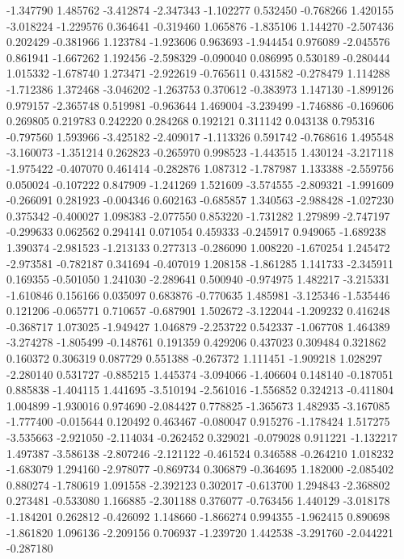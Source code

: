 -1.347790
1.485762
-3.412874
-2.347343
-1.102277
0.532450
-0.768266
1.420155
-3.018224
-1.229576
0.364641
-0.319460
1.065876
-1.835106
1.144270
-2.507436
0.202429
-0.381966
1.123784
-1.923606
0.963693
-1.944454
0.976089
-2.045576
0.861941
-1.667262
1.192456
-2.598329
-0.090040
0.086995
0.530189
-0.280444
1.015332
-1.678740
1.273471
-2.922619
-0.765611
0.431582
-0.278479
1.114288
-1.712386
1.372468
-3.046202
-1.263753
0.370612
-0.383973
1.147130
-1.899126
0.979157
-2.365748
0.519981
-0.963644
1.469004
-3.239499
-1.746886
-0.169606
0.269805
0.219783
0.242220
0.284268
0.192121
0.311142
0.043138
0.795316
-0.797560
1.593966
-3.425182
-2.409017
-1.113326
0.591742
-0.768616
1.495548
-3.160073
-1.351214
0.262823
-0.265970
0.998523
-1.443515
1.430124
-3.217118
-1.975422
-0.407070
0.461414
-0.282876
1.087312
-1.787987
1.133388
-2.559756
0.050024
-0.107222
0.847909
-1.241269
1.521609
-3.574555
-2.809321
-1.991609
-0.266091
0.281923
-0.004346
0.602163
-0.685857
1.340563
-2.988428
-1.027230
0.375342
-0.400027
1.098383
-2.077550
0.853220
-1.731282
1.279899
-2.747197
-0.299633
0.062562
0.294141
0.071054
0.459333
-0.245917
0.949065
-1.689238
1.390374
-2.981523
-1.213133
0.277313
-0.286090
1.008220
-1.670254
1.245472
-2.973581
-0.782187
0.341694
-0.407019
1.208158
-1.861285
1.141733
-2.345911
0.169355
-0.501050
1.241030
-2.289641
0.500940
-0.974975
1.482217
-3.215331
-1.610846
0.156166
0.035097
0.683876
-0.770635
1.485981
-3.125346
-1.535446
0.121206
-0.065771
0.710657
-0.687901
1.502672
-3.122044
-1.209232
0.416248
-0.368717
1.073025
-1.949427
1.046879
-2.253722
0.542337
-1.067708
1.464389
-3.274278
-1.805499
-0.148761
0.191359
0.429206
0.437023
0.309484
0.321862
0.160372
0.306319
0.087729
0.551388
-0.267372
1.111451
-1.909218
1.028297
-2.280140
0.531727
-0.885215
1.445374
-3.094066
-1.406604
0.148140
-0.187051
0.885838
-1.404115
1.441695
-3.510194
-2.561016
-1.556852
0.324213
-0.411804
1.004899
-1.930016
0.974690
-2.084427
0.778825
-1.365673
1.482935
-3.167085
-1.777400
-0.015644
0.120492
0.463467
-0.080047
0.915276
-1.178424
1.517275
-3.535663
-2.921050
-2.114034
-0.262452
0.329021
-0.079028
0.911221
-1.132217
1.497387
-3.586138
-2.807246
-2.121122
-0.461524
0.346588
-0.264210
1.018232
-1.683079
1.294160
-2.978077
-0.869734
0.306879
-0.364695
1.182000
-2.085402
0.880274
-1.780619
1.091558
-2.392123
0.302017
-0.613700
1.294843
-2.368802
0.273481
-0.533080
1.166885
-2.301188
0.376077
-0.763456
1.440129
-3.018178
-1.184201
0.262812
-0.426092
1.148660
-1.866274
0.994355
-1.962415
0.890698
-1.861820
1.096136
-2.209156
0.706937
-1.239720
1.442538
-3.291760
-2.044221
-0.287180
